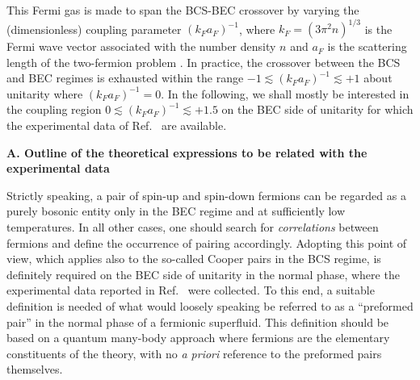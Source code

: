 \documentclass[pra,twocolumn,aps,amssymb,showpacs,superscriptaddress]{revtex4-1}
\begin{document}
This Fermi gas is made to span the BCS-BEC crossover by varying the (dimensionless) coupling parameter $(k_{F} a_{F})^{-1}$, where $k_{F}=(3 \pi^{2} n)^{1/3}$ is the Fermi wave vector associated with the number density $n$ and $a_{F}$ is the scattering length of the two-fermion problem \cite{Physics-Reports-2018}.
In practice, the crossover between the BCS and BEC regimes is exhausted within the range $-1 \lesssim (k_{F} a_{F})^{-1} \lesssim +1$ about unitarity where $(k_{F}a_{F})^{-1} = 0$.
In the following, we shall mostly be interested in the coupling region $0 \lesssim (k_{F} a_{F})^{-1} \lesssim +1.5$ on the BEC side of unitarity for which the experimental data of Ref.~\cite{Ulm-Cam-2019} are available.

\vspace{0.05cm}
\begin{center}
{\bf A. Outline of the theoretical expressions to be related with the experimental data}
\end{center}

Strictly speaking, a pair of spin-up and spin-down fermions can be regarded as a purely bosonic entity only in the BEC regime and at sufficiently low temperatures. In all other cases, one should search for \emph{correlations} between fermions and define the occurrence of pairing accordingly. 
Adopting this point of view, which applies also to the so-called Cooper pairs in the BCS regime, is definitely required on the BEC side of unitarity in the normal phase, where the experimental data reported in Ref.~\cite{Ulm-Cam-2019} were collected.
To this end, a suitable definition is needed of what would loosely speaking be referred to as a ``preformed pair'' in the normal phase of a fermionic superfluid.
This definition should be based on a quantum many-body approach where fermions are the elementary constituents of the theory, with no \emph{a priori} reference to the preformed pairs themselves.
\end{document}

